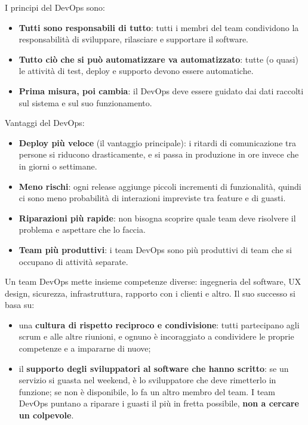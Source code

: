I principi del DevOps sono:

\begin{itemize}
\tightlist
\item
  \textbf{Tutti sono responsabili di tutto}: tutti i membri del team
  condividono la responsabilità di sviluppare, rilasciare e supportare
  il software.
\item
  \textbf{Tutto ciò che si può automatizzare va automatizzato}: tutte (o
  quasi) le attività di test, deploy e supporto devono essere
  automatiche.
\item
  \textbf{Prima misura, poi cambia}: il DevOps deve essere guidato dai
  dati raccolti sul sistema e sul suo funzionamento.
\end{itemize}

Vantaggi del DevOps:

\begin{itemize}
\tightlist
\item
  \textbf{Deploy più veloce} (il vantaggio principale): i ritardi di
  comunicazione tra persone si riducono drasticamente, e si passa in
  produzione in ore invece che in giorni o settimane.
\item
  \textbf{Meno rischi}: ogni release aggiunge piccoli incrementi di
  funzionalità, quindi ci sono meno probabilità di interazioni
  impreviste tra feature e di guasti.
\item
  \textbf{Riparazioni più rapide}: non bisogna scoprire quale team deve
  risolvere il problema e aspettare che lo faccia.
\item
  \textbf{Team più produttivi}: i team DevOps sono più produttivi di
  team che si occupano di attività separate.
\end{itemize}

Un team DevOps mette insieme competenze diverse: ingegneria del
software, UX design, sicurezza, infrastruttura, rapporto con i clienti e
altro. Il suo successo si basa su:

\begin{itemize}
\tightlist
\item
  una \textbf{cultura di rispetto reciproco e condivisione}: tutti
  partecipano agli scrum e alle altre riunioni, e ognuno è incoraggiato
  a condividere le proprie competenze e a impararne di nuove;
\item
  il \textbf{supporto degli sviluppatori al software che hanno scritto}:
  se un servizio si guasta nel weekend, è lo sviluppatore che deve
  rimetterlo in funzione; se non è disponibile, lo fa un altro membro
  del team. I team DevOps puntano a riparare i guasti il più in fretta
  possibile, \textbf{non a cercare un colpevole}.
\end{itemize}

